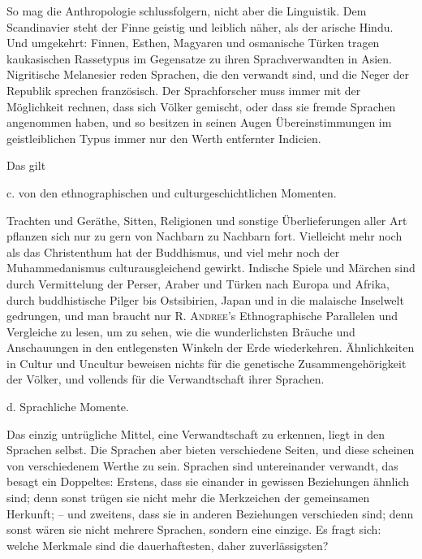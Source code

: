 So mag die Anthropologie schlussfolgern, nicht aber die Linguistik. Dem Scandinavier steht der Finne geistig und leiblich näher, als der arische Hindu. Und umgekehrt: Finnen, Esthen, Magyaren und osmanische Türken tragen kaukasischen Rassetypus im Gegensatze zu ihren  Sprachverwandten in Asien. Nigritische Melanesier reden Sprachen, die den  verwandt sind, und die Neger der Republik  sprechen französisch. Der \label{sp.148} Sprachforscher muss immer mit der Möglichkeit rechnen, dass sich Völker gemischt, oder dass sie fremde Sprachen angenommen haben, und so besitzen in seinen Augen Übereinstimmungen im geistleiblichen Typus immer nur den Werth entfernter Indicien.

Das  gilt

c. von den ethnographischen und culturgeschichtlichen Momenten.\label{III.I.I.2Ac}

Trachten und Geräthe, Sitten, Religionen und sonstige Überlieferungen aller Art pflanzen sich nur zu gern von Nachbarn zu Nachbarn fort. Vielleicht mehr noch als das Christenthum hat der Buddhismus, und viel mehr noch der Muhammedanismus culturausgleichend gewirkt. Indische Spiele und Märchen sind durch Vermittelung der Perser, Araber und Türken nach Europa und Afrika, durch buddhistische Pilger bis Ostsibirien, Japan und in die malaische Inselwelt gedrungen, und man braucht nur \textsc{R. Andree}’s Ethnographische Parallelen und Vergleiche zu lesen, um zu sehen, wie die wunderlichsten Bräuche und Anschauungen in den entlegensten Winkeln der Erde wiederkehren. Ähnlichkeiten in Cultur und Uncultur beweisen nichts für die genetische Zusammengehörigkeit der Völker, und vollends  für die Verwandtschaft ihrer Sprachen.

d. Sprachliche Momente.\label{III.I.I.2Ad}

Das einzig untrügliche Mittel, eine Verwandtschaft zu erkennen, liegt in den Sprachen selbst. Die Sprachen aber bieten verschiedene Seiten, und diese scheinen von verschiedenem Werthe zu sein. Sprachen sind untereinander verwandt, das besagt ein Doppeltes: Erstens, dass sie einander in gewissen Beziehungen ähnlich sind; denn sonst trügen sie nicht mehr die Merkzeichen der gemeinsamen Herkunft; – und zweitens, dass sie in anderen Beziehungen  verschieden sind; denn \label{fp.158} sonst wären sie nicht mehrere Sprachen, sondern eine einzige. Es fragt sich: welche Merkmale sind die dauerhaftesten, daher zuverlässigsten?

